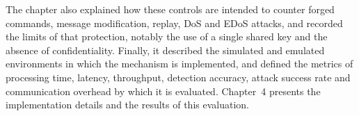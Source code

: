 The chapter also explained how these controls are intended to counter forged commands, message modification, replay, DoS and EDoS attacks, and recorded the limits of that protection, notably the use of a single shared key and the absence of confidentiality. Finally, it described the simulated and emulated environments in which the mechanism is implemented, and defined the metrics of processing time, latency, throughput, detection accuracy, attack success rate and communication overhead by which it is evaluated. Chapter~4 presents the implementation details and the results of this evaluation.
